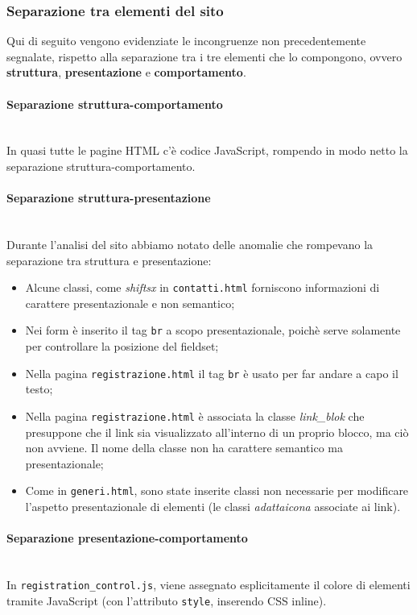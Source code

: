 \subsubsection{Separazione tra elementi del sito}
Qui di seguito vengono evidenziate le incongruenze non precedentemente
segnalate, rispetto alla separazione tra i tre elementi che lo compongono,
ovvero \textbf{struttura}, \textbf{presentazione} e \textbf{comportamento}.

\paragraph{Separazione struttura-comportamento} ~\\
In quasi tutte le pagine HTML c'è codice JavaScript, rompendo in modo netto la
separazione struttura-comportamento.

\paragraph{Separazione struttura-presentazione} ~\\
Durante l'analisi del sito abbiamo notato delle anomalie che rompevano la
separazione tra struttura e presentazione:

\begin{itemize}
\item Alcune classi, come \textit{shiftsx} in \texttt{contatti.html} forniscono
informazioni di carattere presentazionale e non semantico;

\item Nei form è inserito il tag \texttt{br} a scopo presentazionale, poichè
serve solamente per controllare la posizione del fieldset;

\item Nella pagina \texttt{registrazione.html} il tag \texttt{br} è usato per
far andare a capo il testo;

\item Nella pagina \texttt{registrazione.html} è associata la classe
\textit{link\_blok} che presuppone che il link sia visualizzato all'interno di
un proprio blocco, ma ciò non avviene. Il nome della classe non ha carattere
semantico ma presentazionale;

\item Come in \texttt{generi.html}, sono state inserite classi non necessarie
per modificare l'aspetto presentazionale di elementi (le classi
\textit{adattaicona} associate ai link).
\end{itemize}

\paragraph{Separazione presentazione-comportamento} ~\\
In \texttt{registration\_control.js}, viene assegnato esplicitamente il colore
di elementi tramite JavaScript (con l'attributo \texttt{style}, inserendo CSS
inline).
